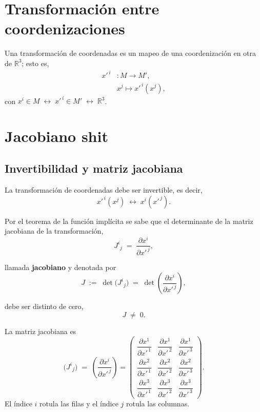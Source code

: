 \documentclass[../apunte_mecanica_clasica.tex]{subfiles}%
\begin{document}
\section{Transformación entre coordenizaciones}

Una transformación de coordenadas es un mapeo de una coordenización en otra de $\mathbb{R}^3$; esto es,
\begin{align*}
x'^{\,i}&: M \to M', \\[4pt]  
&x^{j} \mapsto x'^{\,i}(x^{j}),
\end{align*}
con $x^{i}\in M \;\longleftrightarrow\; x'^{\,i}\in M' \;\longleftrightarrow\; \mathbb{R}^3$.

\newpage

\section{Jacobiano shit}

\subsection{Invertibilidad y matriz jacobiana}

La transformación de coordenadas debe ser invertible, es decir,
\begin{equation*}
    x'^{\,i}(x^{j}) \;\longleftrightarrow\; x^{i}(x'^{\,j}).
\end{equation*}

Por el teorema de la función implícita se sabe que el determinante de la matriz jacobiana de la transformación,
\begin{equation*}
    J^{i}{}_{j} \;=\; \frac{\partial x^{i}}{\partial x'^{\,j}},
\end{equation*}

llamada \textbf{jacobiano} y denotada por
\begin{equation*}
    J \;:=\; \det\!\big(J^{i}{}_{j}\big) \;=\; \det\!\left(\frac{\partial x^{i}}{\partial x'^{\,j}}\right),
\end{equation*}

debe ser distinto de cero,
\begin{equation*}
    J \;\neq\; 0.
\end{equation*}

La matriz jacobiana es
\begin{equation*}
\big(J^{i}{}_{j}\big)\;=\;\left(\frac{\partial x^{i}}{\partial x'^{\,j}}\right)
=\begin{pmatrix}
\dfrac{\partial x^{1}}{\partial x'^{\,1}} & \dfrac{\partial x^{1}}{\partial x'^{\,2}} & \dfrac{\partial x^{1}}{\partial x'^{\,3}}\\[8pt]
\dfrac{\partial x^{2}}{\partial x'^{\,1}} & \dfrac{\partial x^{2}}{\partial x'^{\,2}} & \dfrac{\partial x^{2}}{\partial x'^{\,3}}\\[8pt]
\dfrac{\partial x^{3}}{\partial x'^{\,1}} & \dfrac{\partial x^{3}}{\partial x'^{\,2}} & \dfrac{\partial x^{3}}{\partial x'^{\,3}}
\end{pmatrix}.
\end{equation*}
El índice $i$ rotula las filas y el índice $j$ rotula las columnas.
\end{document}
